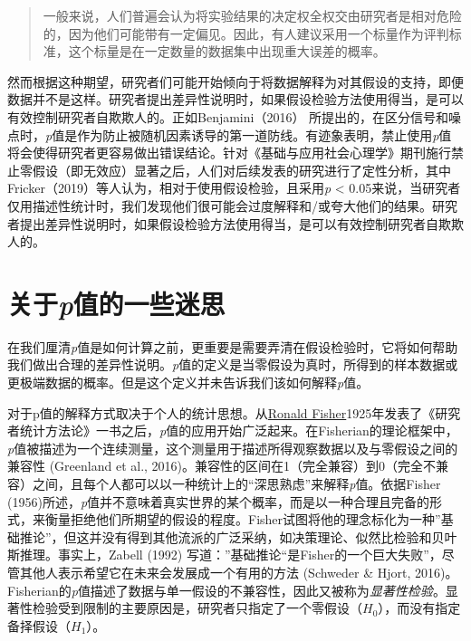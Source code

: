 \documentclass[
  letterpaper,
  DIV=11,
  numbers=noendperiod]{scrreprt}
\begin{document}
\begin{quote}
一般来说，人们普遍会认为将实验结果的决定权全权交由研究者是相对危险的，因为他们可能带有一定偏见。因此，有人建议采用一个标量作为评判标准，这个标量是在一定数量的数据集中出现重大误差的概率。
\end{quote}

然而根据这种期望，研究者们可能开始倾向于将数据解释为对其假设的支持，即便数据并不是这样。研究者提出差异性说明时，如果假设检验方法使用得当，是可以有效控制研究者自欺欺人的。正如Benjamini（2016）
所提出的，在区分信号和噪点时，\emph{p}值是作为防止被随机因素诱导的第一道防线。有迹象表明，禁止使用\emph{p}值将会使得研究者更容易做出错误结论。针对《基础与应用社会心理学》期刊施行禁止零假设（即无效应）显著之后，人们对后续发表的研究进行了定性分析，其中Fricker（2019）等人认为，相对于使用假设检验，且采用\emph{p}
\textless{}
0.05来说，当研究者仅用描述性统计时，我们发现他们很可能会过度解释和/或夸大他们的结果。研究者提出差异性说明时，如果假设检验方法使用得当，是可以有效控制研究者自欺欺人的。

\hypertarget{ux5173ux4e8epux503cux7684ux4e00ux4e9bux8ff7ux601d}{%
\section{\texorpdfstring{关于\emph{p}值的一些迷思}{关于p值的一些迷思}}\label{ux5173ux4e8epux503cux7684ux4e00ux4e9bux8ff7ux601d}}

在我们厘清\emph{p}值是如何计算之前，更重要是需要弄清在假设检验时，它将如何帮助我们做出合理的差异性说明。\emph{p}值的定义是当零假设为真时，所得到的样本数据或更极端数据的概率。但是这个定义并未告诉我们该如何解释\emph{p}值。

对于p值的解释方式取决于个人的统计思想。从\href{https://en.wikipedia.org/wiki/Ronald_Fisher}{Ronald
Fisher}1925年发表了《研究者统计方法论》一书之后，\emph{p}值的应用开始广泛起来。在Fisherian的理论框架中，\emph{p}值被描述为一个连续测量，这个测量用于描述所得观察数据以及与零假设之间的兼容性
(Greenland et al.,
2016)。兼容性的区间在1（完全兼容）到0（完全不兼容）之间，且每个人都可以以一种统计上的``深思熟虑''来解释\emph{p}值。依据Fisher
(1956)所述，\emph{p}值并不意味着真实世界的某个概率，而是以一种合理且完备的形式，来衡量拒绝他们所期望的假设的程度。Fisher试图将他的理念标化为一种''基础推论''，但这并没有得到其他流派的广泛采纳，如决策理论、似然比检验和贝叶斯推理。事实上，Zabell
(1992)
写道：''基础推论``是Fisher的一个巨大失败''，尽管其他人表示希望它在未来会发展成一个有用的方法
(Schweder \& Hjort,
2016)。Fisherian的\emph{p}值描述了数据与单一假设的不兼容性，因此又被称为\emph{显著性检验}。显著性检验受到限制的主要原因是，研究者只指定了一个零假设（\(H_0\)），而没有指定备择假设（\(H_1\)）。
\end{document}
